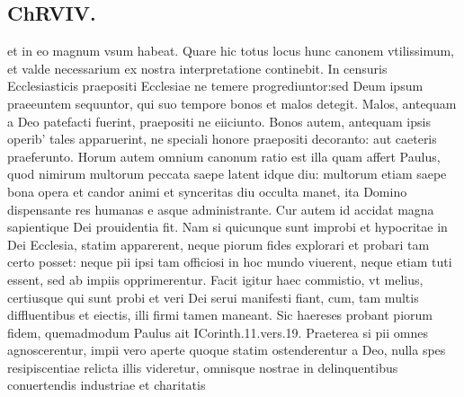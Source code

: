 \documentclass{article}
\begin{document}
\begin{pages}
\section*{ChRVIV. }
\marginpar{[ p.385 ]}\pstart et in eo magnum vsum habeat. Quare hic totus locus hunc canonem vtilissimum, et valde necessarium ex nostra interpretatione continebit. In censuris Ecclesiasticis praepositi Ecclesiae ne temere progrediuntor:sed Deum ipsum praeeuntem sequuntor, qui suo tempore bonos et malos detegit. Malos, antequam a Deo patefacti fuerint, praepositi ne eiiciunto. Bonos autem, antequam ipsis operib' tales apparuerint, ne speciali honore praepositi decoranto: aut caeteris praeferunto. Horum autem omnium canonum ratio est illa quam affert Paulus, quod nimirum multorum peccata saepe latent idque diu: multorum etiam saepe bona opera et candor animi et synceritas diu occulta manet, ita Domino dispensante res humanas e asque administrante.  Cur autem id accidat magna sapientique Dei prouidentia fit. Nam si quicunque sunt improbi et hypocritae in Dei Ecclesia, statim apparerent, neque piorum fides explorari et probari tam certo posset: neque pii ipsi tam officiosi in hoc mundo viuerent, neque etiam tuti essent, sed ab impiis opprimerentur. Facit igitur haec commistio, vt melius, certiusque qui sunt probi et veri Dei serui manifesti fiant, cum, tam multis diffluentibus et eiectis, illi firmi tamen maneant. Sic haereses probant piorum fidem, quemadmodum Paulus ait ICorinth.11.vers.19. Praeterea si pii omnes agnoscerentur, impii vero aperte quoque statim ostenderentur a Deo, nulla spes resipiscentiae relicta illis videretur, omnisque nostrae in delinquentibus conuertendis industriae et charitatis  \pend

\end{pages}
\end{document}
